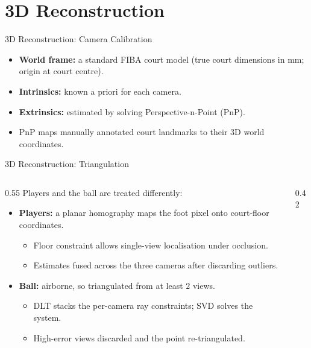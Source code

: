\section{3D Reconstruction}
\label{sec:reconstruction}
\begin{frame}{3D Reconstruction: Camera Calibration}
\begin{itemize}
  \item \textbf{World frame:} a standard FIBA court model (true court dimensions in mm; origin at court centre).
  \item \textbf{Intrinsics:} known a priori for each camera.
  \item \textbf{Extrinsics:} estimated by solving Perspective-n-Point (PnP).
  \item PnP maps manually annotated court landmarks to their 3D world coordinates.
\end{itemize}
\end{frame}

\begin{frame}{3D Reconstruction: Triangulation}
\begin{columns}[T]
  \begin{column}{0.55\textwidth}
    Players and the ball are treated differently:
    \begin{itemize}
      \item \textbf{Players:} a planar homography maps the foot pixel onto court-floor coordinates.
      \begin{itemize}
        \item Floor constraint allows single-view localisation under occlusion.
        \item Estimates fused across the three cameras after discarding outliers.
      \end{itemize}
      \item \textbf{Ball:} airborne, so triangulated from at least $2$ views.
      \begin{itemize}
        \item DLT stacks the per-camera ray constraints; SVD solves the system.
        \item High-error views discarded and the point re-triangulated.
      \end{itemize}
    \end{itemize}
  \end{column}
  \begin{column}{0.42\textwidth}
    \videobox
  \end{column}
\end{columns}
\end{frame}

